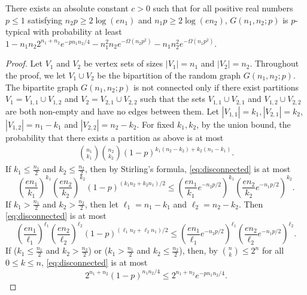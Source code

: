 \begin{lemma} \label{lem:ptyp}
There exists an absolute constant $c > 0$ such that for all positive real numbers $p \le 1$ satisfying $n_2 p \ge 2\log (e n_1)$ and $n_1 p \ge 2\log (e n_2)$, $G(n_1,n_2;p)$ is $p$-typical with probability at least $1 - n_1 n_2 2^{n_1 + n_2} e^{-pn_1n_2/4} - n_1^2 n_2 e^{-\Omega(n_2p^2)} - n_1 n_2^2 e^{-\Omega(n_1p^2)}$.
\end{lemma}
\begin{proof}
Let $V_1$ and $V_2$ be vertex sets of sizes $|V_1| = n_1$ and $|V_2| = n_2$. 
Throughout the proof, we let $V_1 \cup V_2$ be the bipartition of the random graph $G(n_1,n_2;p)$.
The bipartite graph $G(n_1,n_2;p)$ is
not connected only if there exist partitions $V_1 = V_{1,1} \cup V_{1,2}$ 
and $V_2 = V_{2,1} \cup V_{2,2}$ such that the sets $V_{1,1} \cup V_{2,1}$
and $V_{1,2} \cup V_{2,2}$ are both non-empty and have no edges between them. 
Let $|V_{1,1}| = k_1, |V_{2,1}| = k_2$, $|V_{1,2}| = n_1 - k_1$ and $|V_{2,2}| = n_2 - k_2$. 
For fixed $k_1, k_2$, by the union bound, 
the probability that there exists a  partition as above is at most
\begin{align} \label{eq:disconnected}
	{n_1 \choose k_1} {n_2 \choose k_2} (1-p)^{k_1 (n_2 - k_2) + k_2 (n_1 - k_1)}.
\end{align}
If $k_1 \le \frac{n_1}{2}$ and $k_2 \le \frac{n_2}{2}$, then by Stirling's formula, \eqref{eq:disconnected}
is at most
\[
	\left(\frac{en_1}{k_1}\right)^{k_1} 
	\left(\frac{en_2}{k_2}\right)^{k_2}
	(1-p)^{(k_1 n_2 + k_2 n_1)/2}
	\le
	\left(\frac{en_1}{k_1} e^{-n_2p/2}\right)^{k_1} 
	\left(\frac{en_2}{k_2} e^{-n_1p/2}\right)^{k_2}.
\]
If $k_1 > \frac{n_1}{2}$ and $k_2 > \frac{n_2}{2}$, then 
let $\ell_1 = n_1 - k_1$ and $\ell_2 = n_2 - k_2$. Then \eqref{eq:disconnected} is at most
\[
	\left(\frac{en_1}{\ell_1}\right)^{\ell_1} 
	\left(\frac{en_2}{\ell_2}\right)^{\ell_2}
	(1-p)^{(\ell_1 n_2 + \ell_2 n_1)/2}
	\le
	\left(\frac{en_1}{\ell_1} e^{-n_2p/2}\right)^{\ell_1} 
	\left(\frac{en_2}{\ell_2} e^{-n_1p/2}\right)^{\ell_2}.
\]
If ($k_1 \le \frac{n_1}{2}$ and $k_2 > \frac{n_2}{2}$)
or ($k_1 > \frac{n_1}{2}$ and $k_2 \le \frac{n_2}{2}$), then, by ${n \choose k} \leq 2^n$ for all $0 \leq k \leq n$, \eqref{eq:disconnected}
is at most
\[
	2^{n_1 + n_2} (1-p)^{n_1 n_2/4}
	\le 2^{n_1 + n_2} e^{-pn_1n_2/4}.
\]


\end{proof}
